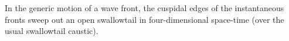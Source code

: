 In the generic motion of a wave front, the cuspidal edges of the instantaneous fronts sweep out an open swallowtail in four-dimensional space-time (over the usual swallowtail caustic).
